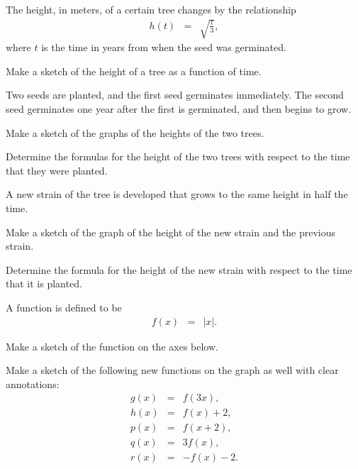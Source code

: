 \begin{problem}
\item The height, in meters, of a certain tree changes by the
  relationship
  \begin{eqnarray*}
    h(t) & = & \sqrt{\frac{t}{3}},
  \end{eqnarray*}
  where $t$ is the time in years from when the seed was germinated.
  \begin{subproblem}
  \item Make a sketch of the height of a tree as a function of time.
    \vfill
  \item Two seeds are planted, and the first seed germinates
    immediately. The second seed germinates one year after the first
    is germinated, and then begins to grow.
    \begin{subsubproblem}
    \item Make a sketch of the graphs of the heights of the two trees.
      \vfill
    \item Determine the formulas for the height of the two trees with
      respect to the time that they were planted.
      \vfill
    \end{subsubproblem}

    \clearpage
  \item A new strain of the tree is developed that grows to the same height
    in half the time. 
    \begin{subsubproblem}
    \item Make a sketch of the graph of the height of the new strain and
      the previous strain.
      \vfill
    \item Determine the formula for the height of the new strain with
      respect to the time that it is planted.
      \vfill
    \end{subsubproblem}
  \end{subproblem}

  \clearpage

\item A function is defined to be
  \begin{eqnarray*}
    f(x) & = & |x|.
  \end{eqnarray*}
  \begin{subproblem}
  \item Make a sketch of the function on the axes below.
  \item Make a sketch of the following new functions on the graph as
    well with clear annotations:
    \begin{eqnarray*}
      g(x) & = & f(3x), \\
      h(x) & = & f(x)+2, \\
      p(x) & = & f(x+2), \\
      q(x) & = & 3f(x), \\
      r(x) & = & -f(x)-2.
    \end{eqnarray*}


\end{subproblem}
\end{problem}
